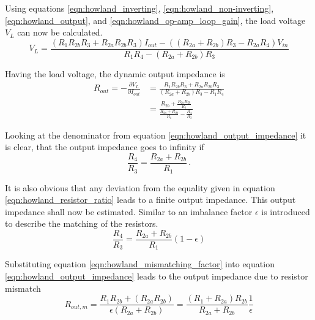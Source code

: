 \documentclass[12pt]{book}
\begin{document}
Using equations \ref{eqn:howland_inverting}, \ref{eqn:howland_non-inverting}, \ref{eqn:howland_output}, and \ref{eqn:howland_op-amp_loop_gain}, the load voltage $V_L$ can now be calculated.
\begin{equation}
    V_L = \frac{\left(R_1 R_{2b} R_3 + R_{2a} R_{2b} R_3\right) I_{out} - \left(\left(R_{2a} + R_{2b}\right) R_3 - R_{2a} R_4 \right) V_{in}}{R_1 R_4 - \left(R_{2a} +R_{2b}\right) R_3}
\end{equation}

Having the load voltage, the dynamic output impedance is
\begin{align}
    R_{out} = -\frac{\partial V_L}{\partial I_{out}} &= \frac{R_1 R_{2b} R_3 + R_{2a} R_{2b} R_3}{\left(R_{2a} +R_{2b}\right) R_3 - R_1 R_4}\nonumber\\
    &= \frac{R_{2b} + \frac{R_{2a} R_{2b}}{R_1}}{\frac{R_{2a} +R_{2b}}{R_1} - \frac{R_4}{R_3}} \label{eqn:howland_output_impedance}
\end{align}

Looking at the denominator from equation \ref{eqn:howland_output_impedance} it is clear, that the output impedance goes to infinity if
\begin{equation}
    \frac{R_4}{R_3} = \frac{R_{2a} + R_{2b}}{R_1}\,.\label{eqn:howland_resistor_ratio}
\end{equation}

It is also obvious that any deviation from the equality given in equation \ref{eqn:howland_resistor_ratio} leads to a finite output impedance. This output impedance shall now be estimated. Similar to \cite{howland_resistor_imbalance} an imbalance factor $\epsilon$ is introduced to describe the matching of the resistors.
\begin{equation}
    \frac{R_4}{R_3} = \frac{R_{2a} + R_{2b}}{R_1} \left(1-\epsilon\right) \label{eqn:howland_mismatching_factor}
\end{equation}

Substituting equation \ref{eqn:howland_mismatching_factor} into equation \ref{eqn:howland_output_impedance} leads to the output impedance due to resistor mismatch
\begin{equation}
    R_{out,m} = \frac{R_1 R_{2b} + \left(R_{2a} R_{2b}\right)}{\epsilon (R_{2a} +R_{2b})} = \frac{\left(R_1 + R_{2a} \right) R_{2b}}{R_{2a} +R_{2b}} \frac{1}{\epsilon}
\end{equation}
\end{document}
